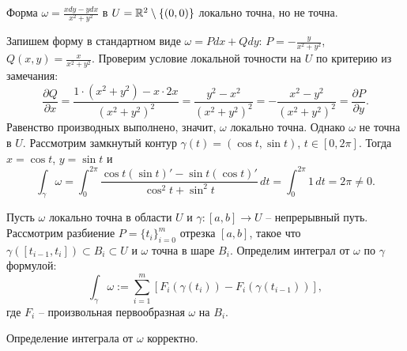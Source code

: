 \begin{example}
	Форма $\omega = \frac{x dy - y dx}{x^2 + y^2}$ в $U = \mathbb{R}^2 \setminus \{(0, 0)\}$ локально точна, но не точна.
\end{example}

\begin{myproof}
	Запишем форму в стандартном виде $\omega = P dx + Q dy$:
	$P = -\frac{y}{x^2 + y^2}$,  $Q(x, y) = \frac{x}{x^2 + y^2}$. 
	Проверим условие локальной точности на $U$ по критерию из замечания:
	\[ \frac{\partial Q}{\partial x} = \frac{1 \cdot (x^2 + y^2) - x \cdot 2x}{(x^2 + y^2)^2} = \frac{y^2 - x^2}{(x^2 + y^2)^2} = -\frac{x^2 - y^2}{(x^2 + y^2)^2} = \frac{\partial P}{\partial y}. \]
	Равенство производных выполнено, значит, $\omega$ локально точна.
	Однако $\omega$ не точна в $U$. Рассмотрим замкнутый контур $\gamma(t) = (\cos t, \sin t)$, $t \in [0, 2\pi]$. Тогда $x = \cos t$, $y = \sin t$ и
	\[ \int_{\gamma} \omega = \int_0^{2\pi} \frac{\cos t (\sin t)' - \sin t (\cos t)'}{\cos^2 t + \sin^2 t} \, dt = \int_0^{2\pi} 1 \, dt = 2\pi \neq 0. \]
\end{myproof}

\begin{definition}
	Пусть $\omega$ локально точна в области $U$ и $\gamma : [a, b] \to U$ -- непрерывный путь. 
	Рассмотрим разбиение $P = \{t_i\}_{i=0}^m$ отрезка $[a, b]$, такое что 
	$\gamma([t_{i-1}, t_i]) \subset B_i \subset U$ и $\omega$ точна в шаре $B_i$. 
	Определим интеграл от $\omega$ по $\gamma$ формулой: 
	\[ \int_{\gamma} \omega := \sum \limits_{i=1}^{m} \left[ F_i(\gamma(t_i)) - F_i(\gamma(t_{i-1})) \right], \]
	где $F_i$ -- произвольная первообразная $\omega$ на $B_i$.
\end{definition}

\begin{lemma}
	Определение интеграла от $\omega$ корректно.
\end{lemma}

